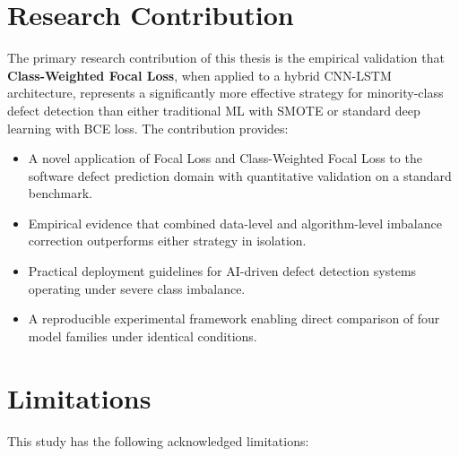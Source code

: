 \documentclass[12pt,a4paper,oneside]{report}
\begin{document}
\section{Research Contribution}

The primary research contribution of this thesis is the empirical validation that \textbf{Class-Weighted Focal Loss}, when applied to a hybrid CNN-LSTM architecture, represents a significantly more effective strategy for minority-class defect detection than either traditional ML with SMOTE or standard deep learning with BCE loss. The contribution provides:

\begin{itemize}
  \item A novel application of Focal Loss and Class-Weighted Focal Loss to the software defect prediction domain with quantitative validation on a standard benchmark.
  \item Empirical evidence that combined data-level and algorithm-level imbalance correction outperforms either strategy in isolation.
  \item Practical deployment guidelines for AI-driven defect detection systems operating under severe class imbalance.
  \item A reproducible experimental framework enabling direct comparison of four model families under identical conditions.
\end{itemize}

\section{Limitations}

This study has the following acknowledged limitations:
\end{document}
